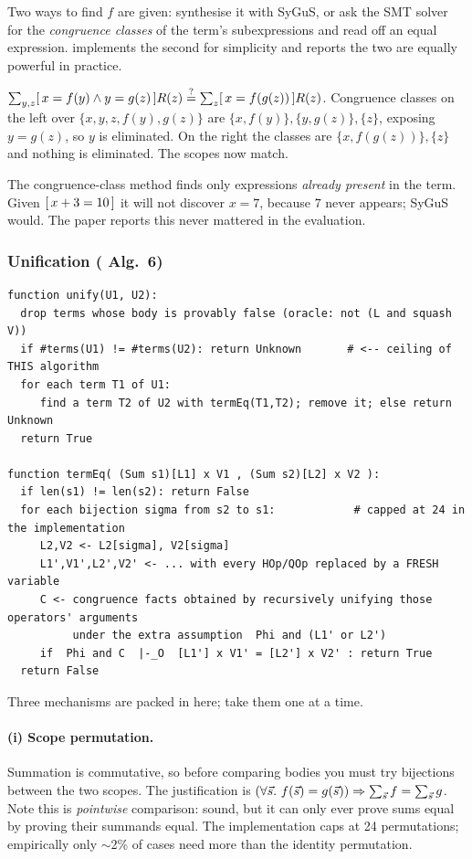 Two ways to find $f$ are given: synthesise it with SyGuS, or ask the SMT solver for the
\emph{congruence classes} of the term's subexpressions and read off an equal expression.
\QED{} implements the second for simplicity and reports the two are equally powerful in
practice.

\begin{example}
$\sum_{y,z}[\,x=f(y)\wedge y=g(z)\,]R(z) \stackrel{?}{=} \sum_{z}[\,x=f(g(z))\,]R(z)$.
Congruence classes on the left over $\{x,y,z,f(y),g(z)\}$ are $\{x,f(y)\},\{y,g(z)\},\{z\}$,
exposing $y=g(z)$, so $y$ is eliminated. On the right the classes are $\{x,f(g(z))\},\{z\}$
and nothing is eliminated. The scopes now match.
\end{example}

\begin{remark}
The congruence-class method finds only expressions \emph{already present} in the term.
Given $[\,x+3=10\,]$ it will not discover $x=7$, because $7$ never appears; SyGuS would.
The paper reports this never mattered in the evaluation.
\end{remark}

\subsubsection{Unification (\cite{qed} Alg.\ 6)}
\begin{lstlisting}[style=pseudo]
function unify(U1, U2):
  drop terms whose body is provably false (oracle: not (L and squash V))
  if #terms(U1) != #terms(U2): return Unknown       # <-- ceiling of THIS algorithm
  for each term T1 of U1:
     find a term T2 of U2 with termEq(T1,T2); remove it; else return Unknown
  return True

function termEq( (Sum s1)[L1] x V1 , (Sum s2)[L2] x V2 ):
  if len(s1) != len(s2): return False
  for each bijection sigma from s2 to s1:            # capped at 24 in the implementation
     L2,V2 <- L2[sigma], V2[sigma]
     L1',V1',L2',V2' <- ... with every HOp/QOp replaced by a FRESH variable
     C <- congruence facts obtained by recursively unifying those operators' arguments
          under the extra assumption  Phi and (L1' or L2')
     if  Phi and C  |-_O  [L1'] x V1' = [L2'] x V2' : return True
  return False
\end{lstlisting}

Three mechanisms are packed in here; take them one at a time.

\paragraph{(i) Scope permutation.} Summation is commutative, so before comparing bodies you
must try bijections between the two scopes. The justification is
$(\forall \vec s.\ f(\vec s)=g(\vec s)) \Rightarrow \sum_{\vec s}f=\sum_{\vec s}g$. Note
this is \emph{pointwise} comparison: sound, but it can only ever prove sums equal by proving
their summands equal. The implementation caps at 24 permutations; empirically only $\sim$2\%
of cases need more than the identity permutation.

